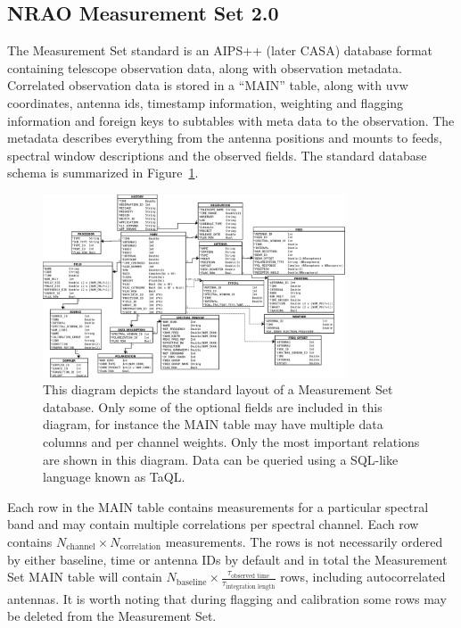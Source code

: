 \subsection{NRAO Measurement Set 2.0}
The Measurement Set standard \cite{ms10,ms20} is an AIPS++ (later CASA) database format containing telescope observation data, 
along with observation metadata. Correlated observation data is stored in a ``MAIN'' table, along with uvw coordinates, antenna ids, 
timestamp information, weighting and flagging information and foreign keys to subtables with meta data to the observation. The 
metadata describes everything from the antenna positions and mounts to feeds, spectral window descriptions and the observed fields. The
standard database schema is summarized in Figure~\ref{FIG_MS_RELATIONS}.
\begin{figure}[ht!]
 \begin{mdframed}
  \centering
  \includegraphics[height=0.35\textheight,width=0.8\textwidth]{images/ms_relations.png}
  \caption[Measurement Set schema]{This diagram depicts the standard layout of a Measurement Set database. Only some of the optional fields
  are included in this diagram, for instance the MAIN table may have multiple data columns and per channel weights. Only the most important
  relations are shown in this diagram. Data can be queried using a SQL-like language known as TaQL.}
  \label{FIG_MS_RELATIONS}
 \end{mdframed}
\end{figure}

Each row in the MAIN table contains measurements for a particular spectral band and may contain multiple correlations per spectral channel. Each
row contains $N_\text{channel}\times N_\text{correlation}$ measurements. The rows is not necessarily 
ordered by either baseline, time or antenna IDs by default and in total the Measurement Set MAIN table
will contain $N_\text{baseline}\times \frac{\tau_\text{observed time}}{\tau_\text{integration length}}$ rows, including autocorrelated antennas. It is worth noting 
that during flagging and calibration some rows may be deleted from the Measurement Set.

